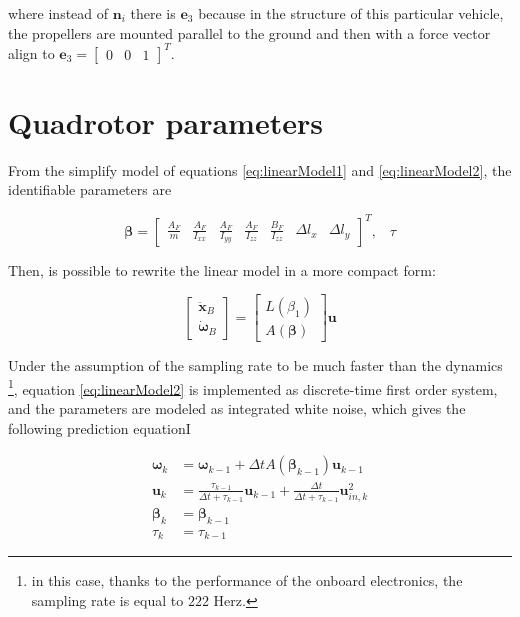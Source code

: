 \noindent where instead of $\mathbf{n}_i$ there is $\mathbf{e}_3$ because in the structure of this particular vehicle, the propellers are mounted parallel to the ground and then with a force vector align to $\mathbf{e}_3=\begin{bmatrix}0 & 0 & 1\end{bmatrix}^T$.


\section{Quadrotor parameters}
\label{quadParameters}

From the simplify model of equations \eqref{eq:linearModel1} and \eqref{eq:linearModel2}, the identifiable parameters are 

\begin{equation}
	\boldsymbol{\beta} =
	\begin{bmatrix}
		\frac{A_F}{m} & \frac{A_F}{I_{xx}} & \frac{A_F}{I_{yy}} & \frac{A_F}{I_{zz}} & \frac{B_F}{I_{zz}} & \Delta l_x & \Delta l_y 
	\end{bmatrix}^T, \hspace{10pt} \tau
	\label{eq:parameters}
\end{equation}

\noindent Then, is possible to rewrite the linear model in a more compact form:

\begin{equation}
	\begin{bmatrix}
		\ddot{\mathbf{x}}_B \\
		\dot{\boldsymbol{\omega}}_B
	\end{bmatrix}
	=
	\begin{bmatrix}
		L(\beta_1) \\
		A(\boldsymbol{\beta})
	\end{bmatrix}
	\mathbf{u}
	\label{eq:linearCompact}
\end{equation}

\noindent Under the assumption of the sampling rate to be much faster than the dynamics \footnote{in this case, thanks to the performance of the onboard electronics, the sampling rate is equal to $222$ Herz.}, equation \eqref{eq:linearModel2} is implemented as discrete-time first order system, and the parameters are modeled as integrated white noise, which gives the following prediction equationI

\begin{align}
	\boldsymbol{\omega}_{k} &= \boldsymbol{\omega}_{k-1}+\Delta t A(\boldsymbol{\beta}_{k-1})\mathbf{u}_{k-1} \\
    \mathbf{u}_k &= \frac{\tau_{k-1}}{\Delta t+\tau_{k-1}}\mathbf{u}_{k-1}+\frac{\Delta t}{\Delta t+\tau_{k-1}}\mathbf{u}_{in,k}^2 \\
    \boldsymbol{\beta}_k &= \boldsymbol{\beta}_{k-1} \\
    \tau_k &= \tau_{k-1}
\end{align}


